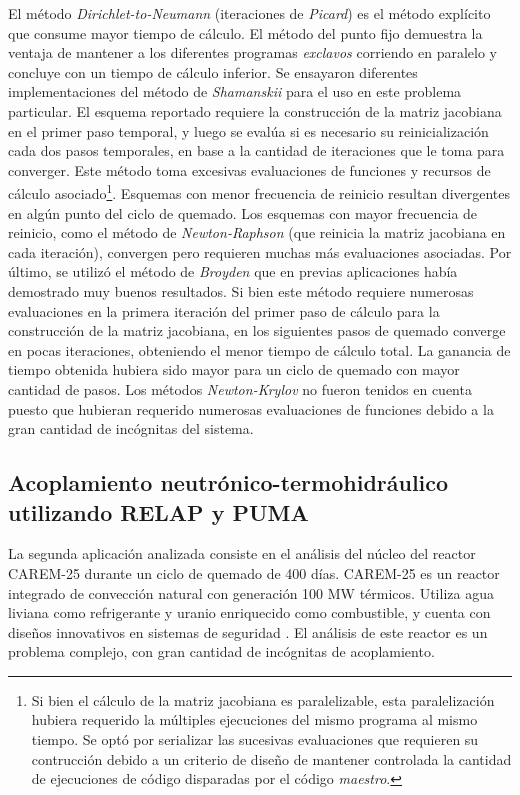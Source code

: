 El método \textit{Dirichlet-to-Neumann} (iteraciones de \textit{Picard}) es el método explícito que consume mayor tiempo de cálculo.
El método del punto fijo demuestra la ventaja de mantener a los diferentes programas \textit{exclavos} corriendo en paralelo y concluye con un tiempo de cálculo inferior.
Se ensayaron diferentes implementaciones del método de \textit{Shamanskii} para el uso en este problema particular.
El esquema reportado requiere la construcción de la matriz jacobiana en el primer paso temporal,
y luego se evalúa si es necesario su reinicialización cada dos pasos temporales,
en base a la cantidad de iteraciones que le toma para converger.
Este método toma excesivas evaluaciones de funciones y recursos de cálculo asociado\footnote{
Si bien el cálculo de la matriz jacobiana es paralelizable,
esta paralelización hubiera requerido la múltiples ejecuciones del mismo programa al mismo tiempo.
Se optó por serializar las sucesivas evaluaciones que requieren su contrucción debido a un criterio de diseño
de mantener controlada la cantidad de ejecuciones de código disparadas por el código \textit{maestro}.
}.
Esquemas con menor frecuencia de reinicio resultan divergentes en algún punto del ciclo de quemado.
Los esquemas con mayor frecuencia de reinicio, como el método de \textit{Newton-Raphson} (que reinicia la matriz jacobiana en cada iteración),
convergen pero requieren muchas más evaluaciones asociadas.
Por último, se utilizó el método de \textit{Broyden} que en previas aplicaciones había demostrado muy buenos resultados.
Si bien este método requiere numerosas evaluaciones en la primera iteración del primer paso de cálculo para la construcción de la matriz jacobiana,
en los siguientes pasos de quemado converge en pocas iteraciones, obteniendo el menor tiempo de cálculo total.
La ganancia de tiempo obtenida hubiera sido mayor para un ciclo de quemado con mayor cantidad de pasos.
Los métodos \textit{Newton-Krylov} no fueron tenidos en cuenta puesto que hubieran requerido numerosas evaluaciones de funciones
debido a la gran cantidad de incógnitas del sistema.

\subsection*{Acoplamiento neutrónico-termohidráulico utilizando RELAP y PUMA}
\label{3:relap-puma}

La segunda aplicación analizada consiste en el análisis del núcleo del reactor CAREM-25 \cite{carem} durante un ciclo de quemado de 400 días.
CAREM-25 es un reactor integrado de convección natural con generación 100 MW térmicos.
Utiliza agua liviana como refrigerante y uranio enriquecido como combustible, y
cuenta con diseños innovativos en sistemas de seguridad \cite{carem}.
El análisis de este reactor es un problema complejo, con gran cantidad de incógnitas de acoplamiento.

